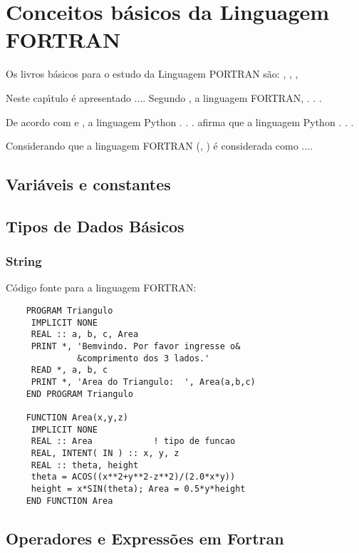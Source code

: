 


\chapter{ Conceitos b\'{a}sicos da Linguagem FORTRAN}

Os livros b\'{a}sicos para o estudo da Linguagem PORTRAN s\~{a}o: \cite{Chivers2018}, \cite{Sebesta2018}, \cite{Metcalf2018}, \cite{Chapman2018}

Neste cap\'{\i}tulo \'{e} apresentado ....  Segundo \cite{Sebesta2018}, a linguagem FORTRAN,  . . .

De acordo com \cite{Sebesta2018} e \cite{roy04}, a linguagem Python . . . \cite{Sebesta2018} afirma que a linguagem Python . . .

Considerando que a linguagem FORTRAN (\cite{Sebesta2018}, \cite{Watt1990}) \'{e} considerada como ....

    \section{Vari\'{a}veis e constantes}


    \section{Tipos de Dados B\'{a}sicos}

            \subsection{String}

    C\'{o}digo fonte para a linguagem FORTRAN:
    \begin{lstlisting}
    PROGRAM Triangulo
     IMPLICIT NONE
     REAL :: a, b, c, Area
     PRINT *, 'Bemvindo. Por favor ingresse o&
              &comprimento dos 3 lados.'
     READ *, a, b, c
     PRINT *, 'Area do Triangulo:  ', Area(a,b,c)
    END PROGRAM Triangulo

    FUNCTION Area(x,y,z)
     IMPLICIT NONE
     REAL :: Area            ! tipo de funcao
     REAL, INTENT( IN ) :: x, y, z
     REAL :: theta, height
     theta = ACOS((x**2+y**2-z**2)/(2.0*x*y))
     height = x*SIN(theta); Area = 0.5*y*height
    END FUNCTION Area
    \end{lstlisting}


    \section{Operadores e Express\~{o}es em Fortran}


